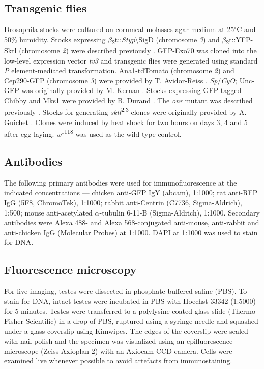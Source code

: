 \documentclass[12pt, twoside, letterpaper]{article}
\begin{document}
\begin{doublespacing}
\begin{linenumbers}
    \subsection*{Transgenic flies}
    Drosophila stocks were cultured on cornmeal molasses agar medium at 25$^{\circ}$C
    and 50\% humidity.
    Stocks expressing $\beta$\textsubscript{2}t::\textit{Styp}\textbackslash{SigD} (chromosome \textit{3}) and
    $\beta$\textsubscript{2}t::YFP-Sktl (chromosome \textit{2}) were described previously \citep{wei2008depletion}.
    GFP-Exo70 was cloned into the low-level expression vector \textit{tv3} \citep{wong2005pip2}
    and transgenic flies were generated using standard \textit{P} element-mediated transformation.
    Ana1-tdTomato (chromosome \textit{2}) and Cep290-GFP (chromosome \textit{3}) were provided
    by T. Avidor-Reiss \citep{basiri2014migrating}.
    \textit{Sp}/\textit{CyO}; Unc-GFP was originally provided by M. Kernan \citep{baker2004mechanosensory}.
    Stocks expressing GFP-tagged Chibby and Mks1 were
    provided by B. Durand \citep{enjolras2012drosophila, vieillard2016transition}.
    The \textit{onr} mutant was described previously \citep{giansanti2015exocyst}.
    Stocks for generating \textit{sktl}\textsuperscript{2.3} clones were originally provided by
    A. Guichet \citep{gervais2008pip5k}.
    Clones were induced by heat shock for two hours on days 3, 4 and 5 after egg laying.
    \textit{w}\textsuperscript{1118} was used as the wild-type control.

    \subsection*{Antibodies}
    The following primary antibodies were used for immunofluorescence
    at the indicated concentrations ---
    chicken anti-GFP IgY (abcam), 1:1000;
    rat anti-RFP IgG (5F8, ChromoTek), 1:1000;
    rabbit anti-Centrin (C7736, Sigma-Aldrich), 1:500;
    mouse anti-acetylated $\alpha$-tubulin 6-11-B (Sigma-Aldrich), 1:1000.
    Secondary antibodies were Alexa 488- and Alexa 568-conjugated
    anti-mouse, anti-rabbit and anti-chicken
    IgG (Molecular Probes) at 1:1000.
    DAPI at 1:1000 was used to stain for DNA. 

    \subsection*{Fluorescence microscopy}
    For live imaging, testes were dissected in phosphate buffered saline (PBS).
    To stain for DNA, intact testes were incubated in PBS with
    Hoechst 33342 (1:5000) for 5 minutes.
    Testes were transferred to a polylysine-coated glass slide (Thermo Fisher Scientific) in a drop of PBS,
    ruptured using a syringe needle and
    squashed under a glass coverslip using Kimwipes.
    The edges of the coverslip were sealed with nail polish
    and the specimen was visualized using an epifluorescence microscope (Zeiss Axioplan 2)
    with an Axiocam CCD camera.
    Cells were examined live whenever possible to avoid artefacts from immunostaining.


\end{linenumbers}
\end{doublespacing}
\end{document}
